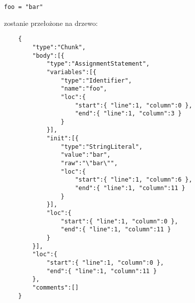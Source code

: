 \begin{lstlisting}[language={[5.3]Lua}]
foo = "bar"
\end{lstlisting}
zostanie przełożone na drzewo:

\begin{lstlisting}
    {
        "type":"Chunk",
        "body":[{
            "type":"AssignmentStatement",
            "variables":[{
                "type":"Identifier",
                "name":"foo",
                "loc":{
                    "start":{ "line":1, "column":0 },
                    "end":{ "line":1, "column":3 }
                }
            }],
            "init":[{
                "type":"StringLiteral",
                "value":"bar",
                "raw":"\"bar\"",
                "loc":{
                    "start":{ "line":1, "column":6 },
                    "end":{ "line":1, "column":11 }
                }
            }],
            "loc":{
                "start":{ "line":1, "column":0 },
                "end":{ "line":1, "column":11 }
            }
        }],
        "loc":{
            "start":{ "line":1, "column":0 },
            "end":{ "line":1, "column":11 }
        },
        "comments":[]
    }
\end{lstlisting}
